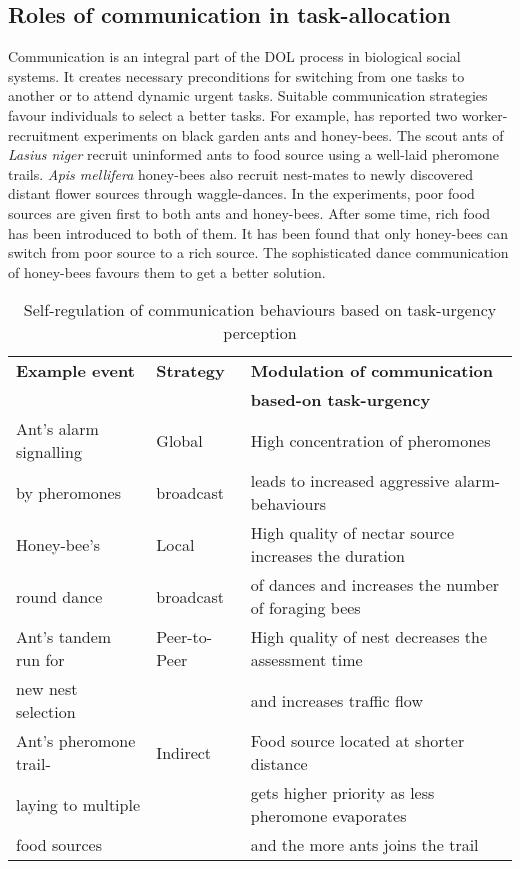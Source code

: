 \subsection{Roles of communication in task-allocation}
\label{bg:bio-comm:comm-role}
Communication is an integral part of the DOL process in biological social systems. It creates necessary  preconditions for switching from one tasks to another or to attend dynamic urgent tasks. Suitable communication strategies favour individuals to select a better tasks. For example,  has reported two worker-recruitment experiments on black garden ants and honey-bees. The scout ants of {\em Lasius niger}  recruit uninformed ants to food source using a well-laid pheromone trails. {\em Apis mellifera} honey-bees also recruit nest-mates to newly discovered distant flower sources through waggle-dances. In the experiments,  poor food sources are given first to both ants and honey-bees. After some time,  rich food has been introduced  to both of them. It has been found that only honey-bees can switch from poor source to a rich source. The sophisticated dance communication of honey-bees favours them to get a better solution. \\
\begin{table}
\caption{Self-regulation of communication behaviours based on task-urgency perception}
\label{table:bio-comm-task-urgency}
\begin{center}
\begin{tabular}{|l||l|l|}
\hline \textbf{Example event} & \textbf{Strategy} & \textbf{Modulation of communication}\\
&  &  \textbf{based-on task-urgency}\\
\hline Ant's alarm signalling &  Global  & High concentration of pheromones\\
by pheromones & broadcast &  leads to increased aggressive alarm-behaviours \\                                                                                                                                               
\hline Honey-bee's  & Local  &  High quality of nectar source increases the duration\\
round dance & broadcast & of dances and increases the number of foraging bees\\
\hline Ant's tandem run for    & Peer-to-Peer & High quality of nest decreases the assessment time\\
new nest selection & &  and increases traffic flow\\
\hline Ant's pheromone trail-  & Indirect & Food source located at shorter distance\\
laying to multiple  & &  gets higher priority as less pheromone evaporates\\
food sources & & and the more ants joins the trail\\
\hline
\end{tabular}
\end{center}
\end{table}
